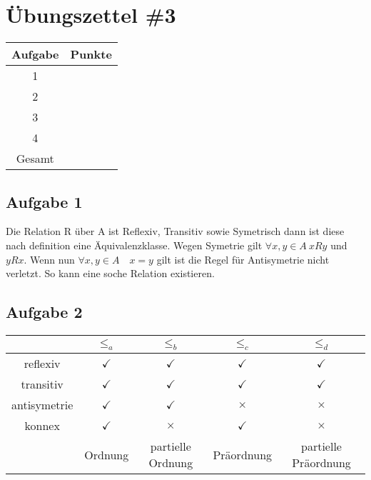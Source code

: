 \documentclass{article}
\begin{document}
\section*{Übungszettel \#3} %

\begin{center}
    \begin{tabular}{|c|c|}
        \hline
        Aufgabe & Punkte \\
        \hline
        1 & \\
        2 & \\
        3 & \\
        4 & \\
        \hline
        Gesamt & \\
        \hline
    \end{tabular}
\end{center}

\subsection*{Aufgabe 1}
    Die Relation R über A ist Reflexiv, Transitiv sowie Symetrisch dann ist diese nach definition eine Äquivalenzklasse. Wegen Symetrie gilt \( \forall x, y \in A \ xRy\) und \(yRx\). Wenn nun \(\forall x, y \in A \quad x = y\) gilt ist die Regel für Antisymetrie nicht verletzt. So kann eine soche Relation existieren. 

\subsection*{Aufgabe 2}
    \begin{center}
        \begin{tabular}{|c|c|c|c|c|}
            \hline
             & \(\leq_a\) & \(\leq_b\) & \(\leq_c\) & \(\leq_d\) \\
            \hline
            reflexiv & \(\checkmark\) & \(\checkmark\) & \(\checkmark\) & \(\checkmark\) \\
            \hline
            transitiv & \(\checkmark\) & \(\checkmark\) & \(\checkmark\) & \(\checkmark\) \\
            \hline
            antisymetrie & \(\checkmark\) & \(\checkmark\) & \(\times\) & \(\times\) \\
            \hline
            konnex & \(\checkmark\) & \(\times\) & \(\checkmark\) & \(\times\) \\
            \hline
             & Ordnung & partielle Ordnung & Präordnung & partielle Präordnung \\
            \hline
        \end{tabular}        
    \end{center}
    
\end{document}
